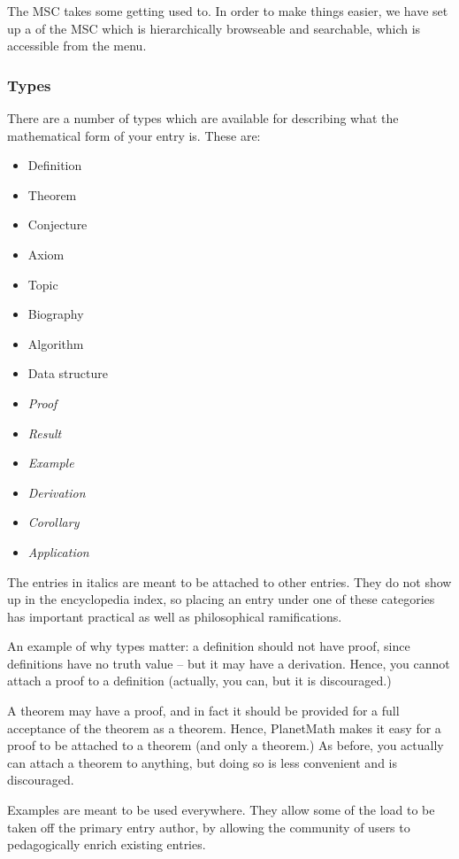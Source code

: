 The MSC takes some getting used to. In order to make things easier, we
have set up a 
of the MSC which is hierarchically browseable and searchable, which
is accessible from the menu.

\subsubsection*{Types}
There are a number of types which are available for describing what
the mathematical form of your entry is. These are:
\begin{itemize}
\item Definition
\item Theorem
\item Conjecture
\item Axiom
\item Topic
\item Biography
\item Algorithm
\item Data structure
\item \textit{Proof}
\item \textit{Result}
\item \textit{Example}
\item \textit{Derivation}
\item \textit{Corollary}
\item \textit{Application}
\end{itemize}
The entries in italics are meant to be attached to other entries. They
do not show up in the encyclopedia index, so placing an entry under
one of these categories has important practical as well as
philosophical ramifications.

An example of why types matter: a definition should not have proof,
since definitions have no truth value -- but it may have a
derivation. Hence, you cannot attach a proof to a definition
(actually, you can, but it is discouraged.)

A theorem may have a proof, and in fact it should be provided for a
full acceptance of the theorem as a theorem. Hence, PlanetMath makes
it easy for a proof to be attached to a theorem (and only a theorem.)
As before, you actually can attach a theorem to anything, but doing so
is less convenient and is discouraged.

Examples are meant to be used everywhere. They allow some of the load
to be taken off the primary entry author, by allowing the community of
users to pedagogically enrich existing entries.


